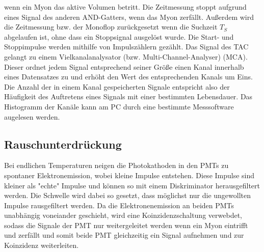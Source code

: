 wenn ein Myon das aktive Volumen betritt. Die Zeitmessung stoppt aufgrund eines Signal des anderen AND-Gatters, wenn das Myon zerfällt. 
Außerdem wird die Zeitmessung bzw. der Monoflop zurückgesetzt wenn die Suchzeit $T_S$ abgelaufen ist, ohne dass ein Stoppsignal ausgelöst wurde.
Die Start- und Stoppimpulse werden mithilfe von Impulszählern gezählt.
Das Signal des TAC gelangt zu einem Vielkanalanalysator (bzw. Multi-Channel-Analyser) (MCA). Dieser ordnet jedem Signal entsprechend
seiner Größe einen Kanal innerhalb eines Datensatzes zu und erhöht den Wert des entsprechenden Kanals um Eins. Die Anzahl der in einem Kanal
gespeicherten Signale entspricht also der Häufigkeit des Auftretens eines Signals mit einer bestimmten Lebensdauer. Das Histogramm der
Kanäle kann am PC durch eine bestimmte Messsoftware augelesen werden.


\subsection{Rauschunterdrückung}
\label{subsec:Rauschunterdrückung}
Bei endlichen Temperaturen neigen die Photokathoden in den PMTs zu spontaner Elektronemission, wobei kleine Impulse entstehen.
Diese Impulse sind kleiner als "echte" Impulse und können so mit einem Diskriminator herausgefiltert werden. Die Schwelle wird
dabei so gesetzt, dass möglichst nur die ungewollten Impulse rausgefiltert werden. Da die Elektronenemission an beiden PMTs unabhängig
voneiander geschieht, wird eine Koinzidenzschaltung verwebdet, sodass die Signale der PMT
nur weitergeleitet werden wenn ein Myon eintrifft und zerfällt und somit beide PMT gleichzeitig ein Signal aufnehmen und zur Koinzidenz weiterleiten.

